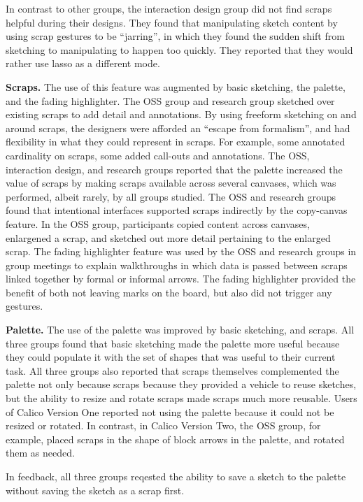 In contrast to other groups, the interaction design group did not find scraps helpful during their designs. They found that manipulating sketch content by using scrap gestures to be ``jarring'', in which they found the sudden shift from sketching to manipulating to happen too quickly. They reported that they would rather use lasso as a different mode. 

\textbf{Scraps.} The use of this feature was augmented by basic sketching, the palette, and the fading highlighter. The OSS group and research group sketched over existing scraps to add detail and annotations. By using freeform sketching on and around scraps, the designers were afforded an ``escape from formalism'', and had flexibility in what they could represent in scraps. For example, some annotated cardinality on scraps, some added call-outs and annotations. The OSS, interaction design, and research groups reported that the palette increased the value of scraps by making scraps available across several canvases, which was performed, albeit rarely, by all groups studied. The OSS and research groups found that intentional interfaces supported scraps indirectly by the copy-canvas feature. In the OSS group, participants copied content across canvases, enlargened a scrap, and sketched out more detail pertaining to the enlarged scrap. The fading highlighter feature was used by the OSS and research groups in group meetings to explain walkthroughs in which data is passed between scraps linked together by formal or informal arrows. The fading highlighter provided the benefit of both not leaving marks on the board, but also did not trigger any gestures.

\textbf{Palette.} The use of the palette was improved by basic sketching, and scraps. All three groups found that basic sketching made the palette more useful because they could populate it with the set of shapes that was useful to their current task. All three groups also reported that scraps themselves complemented the palette not only because scraps because they provided a vehicle to reuse sketches, but the ability to resize and rotate scraps made scraps much more reusable. Users of Calico Version One reported not using the palette because it could not be resized or rotated. In contrast, in Calico Version Two, the OSS group, for example, placed scraps in the shape of block arrows in the palette, and rotated them as needed. 

In feedback, all three groups reqested the ability to save a sketch to the palette without saving the sketch as a scrap first.

